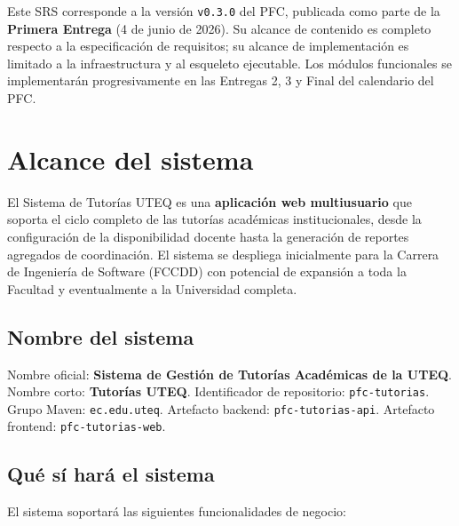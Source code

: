 \documentclass[11pt,a4paper,twoside]{report}
\begin{document}
Este SRS corresponde a la versi\'on \texttt{v0.3.0} del PFC, publicada como parte de la \textbf{Primera Entrega} (4 de junio de 2026). Su alcance de contenido es completo respecto a la especificaci\'on de requisitos; su alcance de implementaci\'on es limitado a la infraestructura y al esqueleto ejecutable. Los m\'odulos funcionales se implementar\'an progresivamente en las Entregas 2, 3 y Final del calendario del PFC.

\section{Alcance del sistema}
\label{sec:alcance}

El Sistema de Tutor\'ias UTEQ es una \textbf{aplicaci\'on web multiusuario} que soporta el ciclo completo de las tutor\'ias acad\'emicas institucionales, desde la configuraci\'on de la disponibilidad docente hasta la generaci\'on de reportes agregados de coordinaci\'on. El sistema se despliega inicialmente para la Carrera de Ingenier\'ia de Software (FCCDD) con potencial de expansi\'on a toda la Facultad y eventualmente a la Universidad completa.

\subsection{Nombre del sistema}

Nombre oficial: \textbf{Sistema de Gesti\'on de Tutor\'ias Acad\'emicas de la UTEQ}. Nombre corto: \textbf{Tutor\'ias UTEQ}. Identificador de repositorio: \texttt{pfc-tutorias}. Grupo Maven: \texttt{ec.edu.uteq}. Artefacto backend: \texttt{pfc-tutorias-api}. Artefacto frontend: \texttt{pfc-tutorias-web}.

\subsection{Qu\'e s\'i har\'a el sistema}

El sistema soportar\'a las siguientes funcionalidades de negocio:
\end{document}
